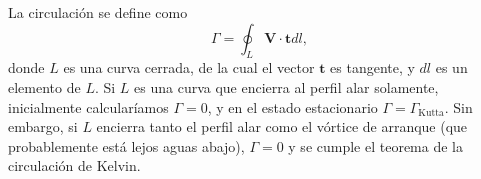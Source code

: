 La circulación se define como
%
\begin{equation}
\Gamma = \oint_L\mathbf{V}\cdot\mathbf{t}dl,
\end{equation}
%
donde $L$ es una curva cerrada, de la cual el vector $\mathbf{t}$ es tangente, y $dl$ es un elemento de $L$.
Si $L$ es una curva que encierra al perfil alar solamente, inicialmente calcularíamos $\Gamma=0$, y en el estado estacionario $\Gamma=\Gamma_\text{Kutta}$.
Sin embargo, si $L$ encierra tanto el perfil alar como el vórtice de arranque (que probablemente está lejos aguas abajo), $\Gamma=0$ y se cumple el teorema de la circulación de Kelvin.
